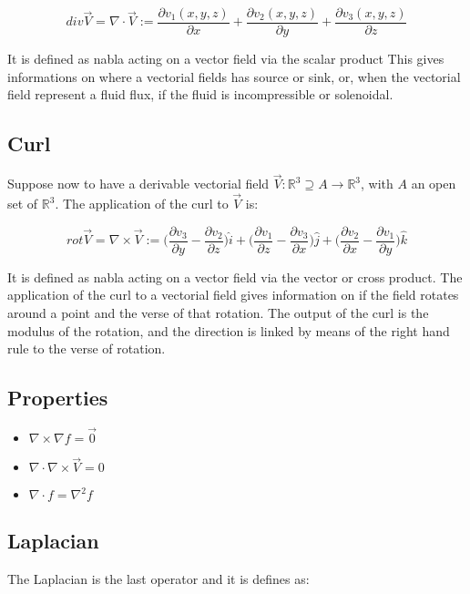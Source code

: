 	$$div\vec{V} = \nabla\cdot\vec{V} := \frac{\partial v_1(x,y,z)}{\partial x} + \frac{\partial v_2(x,y,z)}{\partial y} + \frac{\partial v_3(x,y,z)}{\partial z}$$

	It is defined as nabla acting on a vector field via the scalar product
	This gives informations on where a vectorial fields has source or sink, or, when the vectorial field represent a fluid flux, if the fluid is incompressible or solenoidal.

	\subsection{Curl}
	Suppose now to have a derivable vectorial field $\vec{V}:\mathbb{R}^3\supseteq A \rightarrow\mathbb{R}^3$, with $A$ an open set of $\mathbb{R}^3$.
	The application of the curl to $\vec{V}$ is:

	$$rot\vec{V} = \nabla\times\vec{V} := \biggl(\frac{\partial v_3}{\partial y} - \frac{\partial v_2}{\partial z}\biggr)\hat{i} + \biggl(\frac{\partial v_1}{\partial z} - \frac{\partial v_3}{\partial x}\biggr)\hat{j} + \biggl(\frac{\partial v_2}{\partial x} - \frac{\partial v_1}{\partial y}\biggr)\hat{k}$$

	It is defined as nabla acting on a vector field via the vector or cross product.
	The application of the curl to a vectorial field gives information on if the field rotates around a point and the verse of that rotation.
	The output of the curl is the modulus of the rotation, and the direction is linked by means of the right hand rule to the verse of rotation.

	\subsection{Properties}

	\begin{multicols}{3}
		\begin{itemize}
			\item $\nabla\times\nabla f = \vec{0}$
			\item $\nabla\cdot\nabla\times\vec{V} = 0$
			\item $\nabla\cdot f = \nabla^2 f$
		\end{itemize}
	\end{multicols}

	\subsection{Laplacian}
	The Laplacian is the last operator and it is defines as:

